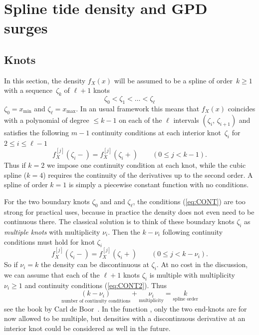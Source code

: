 \documentclass[11pt,a4paper]{report}\usepackage[]{graphicx}\usepackage[]{color}
\newcommand{\Low}[1]{#1_{\mathrm{min}}}
\newcommand{\Up}[1]{#1_{\mathrm{max}}}
\begin{document}
\section{Spline tide density and GPD surges}
\label{AnnSpline}
\subsection{Knots}
In this section,  the density $f_X(x)$ will be assumed to be a spline
of order~$k \geqslant 1$ with a sequence~$\zeta_k$ of $\ell + 1$ knots
$$
   \zeta_0 < \zeta_1 < \dots < \zeta_{\ell}
$$
$\zeta_0 = \Low{x}$ and $\zeta_\ell = \Up{x}$. In an usual framework
this means that $f_X(x)$ coincides with a polynomial of degree
$\leqslant k-1$ on each of the $\ell$ intervals
$(\zeta_i,\,\zeta_{i+1})$ and satisfies the following $m-1$ continuity
conditions at each interior knot~$\zeta_i$ for $2 \leqslant i
\leqslant \ell -1$
\begin{equation}
  \label{eq:CONT}
  f_X^{[j]}(\zeta_i-) = f_X^{[j]}(\zeta_i+)  \qquad 
  (0 \leqslant j < k-1). 
\end{equation}
Thus if $k=2$ we impose one continuity condition at each knot, while
the cubic spline ($k = 4$) requires the continuity of the derivatives
up to the second order. A spline of order $k=1$ is simply a piecewise
constant function with no conditions.

For the two boundary knots $\zeta_0$ and and $\zeta_\ell$, the
conditions (\ref{eq:CONT}) are too strong for practical uses, because
in practice the density does not even need to be continuous there.  The
classical solution is to think of these boundary knots $\zeta_i$ as
\textit{multiple knots} with multiplicity $\nu_i$. Then the $k-\nu_i$ following
continuity conditions must hold for knot $\zeta_i$
\begin{equation}
  \label{eq:CONT2}
  f_X^{[j]}(\zeta_i-) = f_X^{[j]}(\zeta_i+)  \qquad 
  (0 \leqslant j < k - \nu_i). 
\end{equation}
So if $\nu_i=k$ the density can be discontinuous at $\zeta_i$.  At no
cost in the discussion, we can assume that each of the $\ell + 1$
knots $\zeta_i$ is multiple with multiplicity $\nu_i \geqslant 1$ and
continuity conditions (\ref{eq:CONT2}). Thus
$$
   \underset{\textrm{number of continuity conditions}}{(k - \nu_i )} 
   + \underset{\textrm{multiplicity}}{\nu_i}   = 
   \underset{\textrm{spline order}}{k}
$$
see the book by Carl de Boor~\cite{deBoor}. In the function \verb@SplineDensity@, only the two
end-knots are for now allowed to be multiple, but densities with a
discontinuous derivative at an interior knot could be considered as
well in the future. 
\end{document}
